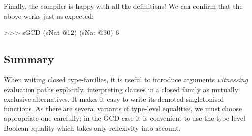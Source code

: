 \documentclass[demotion-paper.tex]{subfiles}
\begin{document}
Finally, the compiler is happy with all the definitions!
We can confirm that the above  works just as expected:
\begin{repl}
>>> sGCD (sNat @12) (sNat @30)
6
\end{repl}

\subsection*{Summary}
When writing closed type-families, it is useful to introduce arguments \emph{witnessing} evaluation paths explicitly, interpreting clauses in a closed family as mutually exclusive alternatives.
It makes it easy to write its demoted singletonised functions.
As there are several variants of type-level equalities, we must choose appropriate one carefully; in the GCD case it is convenient to use the type-level Boolean equality which takes only reflexivity into account.
\end{document}

